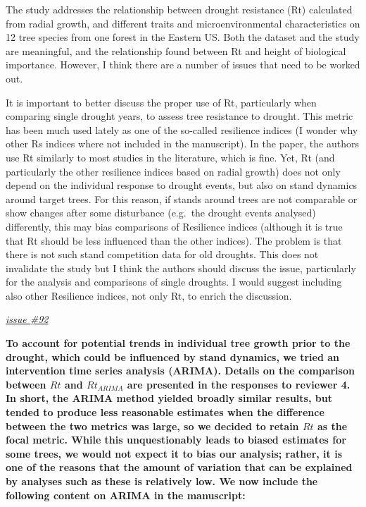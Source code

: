 \documentclass[
]{article}
\begin{document}
The study addresses the relationship between drought resistance (Rt)
calculated from radial growth, and different traits and
microenvironmental characteristics on 12 tree species from one forest in
the Eastern US. Both the dataset and the study are meaningful, and the
relationship found between Rt and height of biological importance.
However, I think there are a number of issues that need to be worked
out.

It is important to better discuss the proper use of Rt, particularly
when comparing single drought years, to assess tree resistance to
drought. This metric has been much used lately as one of the so-called
resilience indices (I wonder why other Rs indices where not included in
the manuscript). In the paper, the authors use Rt similarly to most
studies in the literature, which is fine. Yet, Rt (and particularly the
other resilience indices based on radial growth) does not only depend on
the individual response to drought events, but also on stand dynamics
around target trees. For this reason, if stands around trees are not
comparable or show changes after some disturbance (e.g.~the drought
events analysed) differently, this may bias comparisons of Resilience
indices (although it is true that Rt should be less influenced than the
other indices). The problem is that there is not such stand competition
data for old droughts. This does not invalidate the study but I think
the authors should discuss the issue, particularly for the analysis and
comparisons of single droughts. I would suggest including also other
Resilience indices, not only Rt, to enrich the discussion.

\href{https://github.com/SCBI-ForestGEO/McGregor_climate-sensitivity-variation/issues/92}{\emph{issue
\#92}}

\textbf{To account for potential trends in individual tree growth prior
to the drought, which could be influenced by stand dynamics, we tried an
intervention time series analysis (ARIMA). Details on the comparison
between \(Rt\) and \(Rt_{ARIMA}\) are presented in the responses to
reviewer 4. In short, the ARIMA method yielded broadly similar results,
but tended to produce less reasonable estimates when the difference
between the two metrics was large, so we decided to retain \(Rt\) as the
focal metric. While this unquestionably leads to biased estimates for
some trees, we would not expect it to bias our analysis; rather, it is
one of the reasons that the amount of variation that can be explained by
analyses such as these is relatively low. We now include the following
content on ARIMA in the manuscript:}
\end{document}

